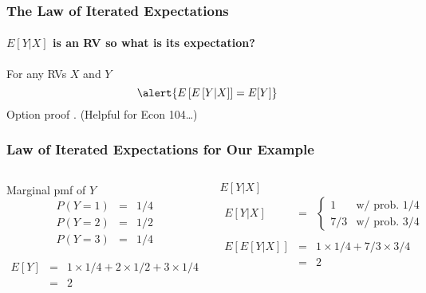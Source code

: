 \begin{frame}
\frametitle{The Law of Iterated Expectations}
\framesubtitle{$E[Y|X]$ is an RV so what is its expectation?}
For any RVs $X$ and $Y$
	$$\alert{E\left[E\left[Y|X  \right]  \right] = E[Y]}$$
Option proof \textcolor{blue}{\href{http://ditraglia.com/Econ103Public/OptionalProofs.pdf}{}}.
(Helpful for Econ 104\dots)


\end{frame}
\begin{frame}[t]
\frametitle{Law of Iterated Expectations for Our Example}

\begin{columns}
\footnotesize
{}
\begin{block}{Marginal pmf of $Y$}
\begin{eqnarray*}
	P(Y = 1) &=& 1/4 \\
	P(Y = 2) &=& 1/2\\
	P(Y = 3) &=& 1/4
\end{eqnarray*}


\begin{eqnarray*}
	E[Y] &=& 1\times 1/4 + 2 \times 1/2 + 3 \times 1/4\\
		&=&2
\end{eqnarray*}
\end{block}

\begin{block}{$E[Y|X]$}
	\begin{eqnarray*}
	 E[Y|X] &=& \left\{\begin{array}{cc} 1& \mbox{w/ prob. } 1/4\\ 7/3& \mbox{w/ prob. } 3/4\end{array}\right.\\\\ 
	 E\left[E\left[Y|X \right] \right] &=& 1 \times 1/4 + 7/3 \times 3/4\\ 
	 &=& 2
	\end{eqnarray*}
	\vspace{1em}
\end{block}

\end{columns}

\end{frame}
